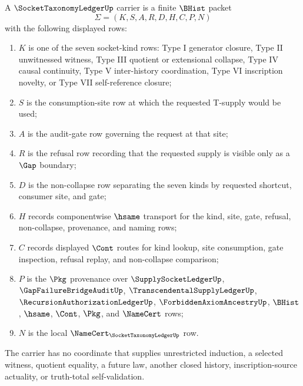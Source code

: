 \begin{definition}
\label{def:socket-taxonomy-ledger-carrier}
A $\SocketTaxonomyLedgerUp$ carrier is a finite $\BHist$ packet
$$
\Sigma=(K,S,A,R,D,H,C,P,N)
$$
with the following displayed rows:
\begin{enumerate}
\item $K$ is one of the seven socket-kind rows: Type I generator closure, Type II unwitnessed witness, Type III quotient or extensional collapse, Type IV causal continuity, Type V inter-history coordination, Type VI inscription novelty, or Type VII self-reference closure;
\item $S$ is the consumption-site row at which the requested T-supply would be used;
\item $A$ is the audit-gate row governing the request at that site;
\item $R$ is the refusal row recording that the requested supply is visible only as a $\Gap$ boundary;
\item $D$ is the non-collapse row separating the seven kinds by requested shortcut, consumer site, and gate;
\item $H$ records componentwise $\hsame$ transport for the kind, site, gate, refusal, non-collapse, provenance, and naming rows;
\item $C$ records displayed $\Cont$ routes for kind lookup, site consumption, gate inspection, refusal replay, and non-collapse comparison;
\item $P$ is the $\Pkg$ provenance over $\SupplySocketLedgerUp$, $\GapFailureBridgeAuditUp$, $\TranscendentalSupplyLedgerUp$, $\RecursionAuthorizationLedgerUp$, $\ForbiddenAxiomAncestryUp$, $\BHist$, $\hsame$, $\Cont$, $\Pkg$, and $\NameCert$ rows;
\item $N$ is the local $\NameCert_{\SocketTaxonomyLedgerUp}$ row.
\end{enumerate}
The carrier has no coordinate that supplies unrestricted induction, a selected witness, quotient equality, a future law, another closed history, inscription-source actuality, or truth-total self-validation.
\end{definition}

